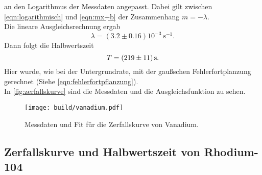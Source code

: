 \noindent
an den Logarithmus der Messdaten angepasst. 
Dabei gilt zwischen \autoref{eqn:logarithmisch} und \autoref{eqn:mx+b} der 
Zusammenhang $m = -\lambda$.
\\
Die lineare Ausgleichsrechnung ergab
\begin{equation}
	\lambda = (3.2 \pm 0.16) 10^{-3} \  \si{\second}^{-1}.
\end{equation}
\noindent Dann folgt die Halbwertszeit
\begin{equation}
	T = \SI{219\pm11}{\second}.
\end{equation}
Hier wurde, wie bei der Untergrundrate, mit der gaußschen Fehlerfortplanzung gerechnet (Siehe 
\autoref{eqn:fehlerfortpflanzung}).
\\
In \autoref{fig:zerfallskurve} sind die Messdaten und die Ausgleichsfunktion zu sehen.

\begin{figure}[H]
	\centering
	\texttt{[image: build/vanadium.pdf]}
	\caption{Messdaten und Fit für die Zerfallskurve von Vanadium.}
	\label{fig:zerfallskurve}
\end{figure}


\subsection{Zerfallskurve und Halbwertszeit von Rhodium-104}
\label{sec:aus:rhodium}


